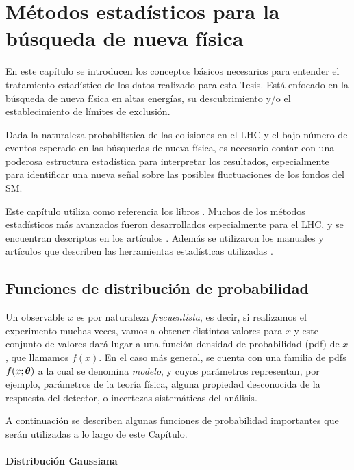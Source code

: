 \chapter{Métodos estadísticos para la búsqueda de nueva física}
\label{cap:estadistica}

En este capítulo se introducen los conceptos básicos necesarios para entender el
tratamiento estadístico de los datos realizado para esta Tesis. Está enfocado en
la búsqueda de nueva física en altas energías, su descubrimiento y/o el
establecimiento de límites de exclusión.

Dada la naturaleza probabilística de las colisiones en el LHC y el bajo número
de eventos esperado en las búsquedas de nueva física, es necesario contar con
una poderosa estructura estadística para interpretar los resultados, especialmente
para identificar una nueva señal sobre las posibles fluctuaciones de los fondos
del SM.

Este capítulo utiliza como referencia los libros \cite{Cowan,James}. Muchos de
los métodos estadísticos más avanzados fueron desarrollados especialmente para
el LHC, y se encuentran descriptos en los artículos
\cite{AsymAprox,ReadCLs,medsigNote,Cranmer:2015nia}. Además se utilizaron los
manuales y artículos que describen las herramientas estadísticas utilizadas
\cite{Cranmer:1456844,HistFitter}.


\section{Funciones de distribución de probabilidad}

Un observable $x$ es por naturaleza \emph{frecuentista}, es decir, si realizamos
el experimento muchas veces, vamos a obtener distintos valores para $x$ y este
conjunto de valores dará lugar a una función densidad de probabilidad (pdf)
de $x$, que llamamos $f(x)$. En el caso más general, se cuenta con una familia
de pdfs $f(x;\bm{\theta})$ a la cual se denomina \emph{modelo}, y cuyos parámetros
representan, por ejemplo, parámetros de la teoría física, alguna
propiedad desconocida de la respuesta del detector, o incertezas sistemáticas
del análisis.

A continuación se describen algunas funciones de probabilidad importantes que
serán utilizadas a lo largo de este Capítulo.

\subsubsection{Distribución Gaussiana}

